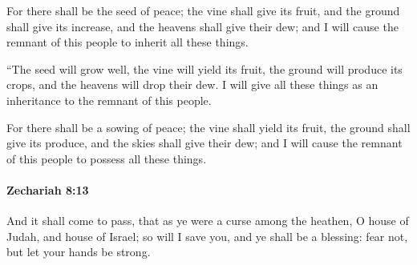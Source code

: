 			\begin{versebox}
					\item[BHS] 
					\item[LXX] 
					\item[ASV] For there shall be the seed of peace; the vine shall give its fruit, and the ground shall give its increase, and the heavens shall give their dew; and I will cause the remnant of this people to inherit all these things.
					\item[NIV] “The seed will grow well, the vine will yield its fruit, the ground will produce its crops, and the heavens will drop their dew. I will give all these things as an inheritance to the remnant of this people.
					\item[NRSV] For there shall be a sowing of peace; the vine shall yield its fruit, the ground shall give its produce, and the skies shall give their dew; and I will cause the remnant of this people to possess all these things.
			\end{versebox}

		\paragraph{Zechariah 8:13} %
			\label{ZECHARIAH-8-13}

			And it shall come to pass, that as ye were a curse among the heathen, O house of Judah, and house of Israel; so will I save you, and ye shall be a blessing: fear not, but let your hands be strong.

